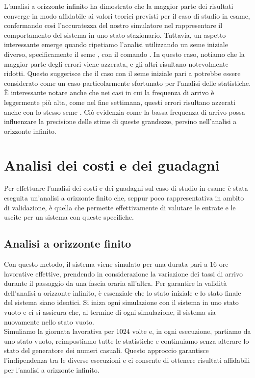 \documentclass[a4paper, 12pt]{article}
\newcommand{\key}[1]{\texttt{\StrSubstitute{#1}{_}{\_}}}
\begin{document}
L'analisi a orizzonte infinito ha dimostrato che la maggior parte dei risultati converge in modo affidabile ai valori teorici previsti per il caso di studio in esame, confermando così l'accuratezza del nostro simulatore nel rappresentare il comportamento del sistema in uno stato stazionario. Tuttavia, un aspetto interessante emerge quando ripetiamo l'analisi utilizzando un seme iniziale diverso, specificamente il seme \key{12345}, con il comando \key{make clean infinite-weekend SEED=12345}. In questo caso, notiamo che la maggior parte degli errori viene azzerata, e gli altri risultano notevolmente ridotti. Questo suggerisce che il caso con il seme iniziale pari a \key{123} potrebbe essere considerato come un caso particolarmente sfortunato per l'analisi delle statistiche.\\

È interessante notare anche che nei casi in cui la frequenza di arrivo è leggermente più alta, come nel fine settimana, questi errori risultano azzerati anche con lo stesso seme \key{123}. Ciò evidenzia come la bassa frequenza di arrivo possa influenzare la precisione delle stime di queste grandezze, persino nell'analisi a orizzonte infinito. 

\section{Analisi dei costi e dei guadagni}
Per effettuare l'analisi dei costi e dei guadagni sul caso di studio in esame è stata eseguita un'analisi a orizzonte finito che, seppur poco rappresentativa in ambito di validazione, è quella che permette effettivamente di valutare le entrate e le uscite per un sistema con queste specifiche. 

\subsection{Analisi a orizzonte finito}
Con questo metodo, il sistema viene simulato per una durata pari a 16 ore lavorative effettive, prendendo in considerazione la variazione dei tassi di arrivo durante il passaggio da una fascia oraria all'altra. Per garantire la validità dell'analisi a orizzonte infinito, è essenziale che lo stato iniziale e lo stato finale del sistema siano identici. Si iniza ogni simulazione con il sistema in uno stato vuoto e ci si assicura che, al termine di ogni simulazione, il sistema sia nuovamente nello stato vuoto.\\

Simuliamo la giornata lavorativa per 1024 volte e, in ogni esecuzione, partiamo da uno stato vuoto, reimpostiamo tutte le statistiche e continuiamo senza alterare lo stato del generatore dei numeri casuali. Questo approccio garantisce l'indipendenza tra le diverse esecuzioni e ci consente di ottenere risultati affidabili per l'analisi a orizzonte infinito.\\
\end{document}
